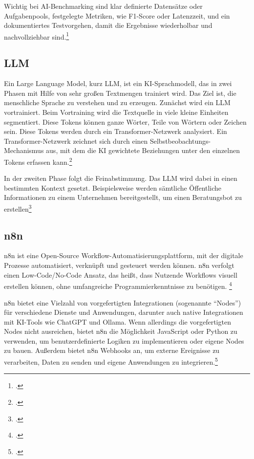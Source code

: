 \documentclass[12pt,a4paper]{article}
\begin{document}
    Wichtig bei AI-Benchmarking sind klar definierte Datensätze oder Aufgabenpools, festgelegte Metriken, wie F1-Score oder Latenzzeit, und ein dokumentiertes Testvorgehen, damit die Ergebnisse wiederholbar und nachvollziehbar sind.\footcite{Benchmarking-AI-Models-in-Software-Engineering}

    \subsection{LLM}
    Ein Large Language Model, kurz LLM, ist ein KI-Sprachmodell, das in zwei Phasen mit Hilfe von sehr großen Textmengen
    trainiert wird. Das Ziel ist, die menschliche Sprache zu verstehen und zu erzeugen. Zunächst wird ein LLM
    vortrainiert. Beim Vortraining wird die Textquelle in viele kleine Einheiten segmentiert. Diese Tokens können ganze
    Wörter, Teile von Wörtern oder Zeichen sein. Diese Tokens werden durch ein Transformer-Netzwerk analysiert. Ein
    Transformer-Netzwerk zeichnet sich durch einen Selbstbeobachtungs-Mechanismus aus, mit dem die KI gewichtete
    Beziehungen unter den einzelnen Tokens erfassen kann.\footnote{\cite{strykerLlmsDefinition}.}

    In der zweiten Phase folgt die Feinabstimmung. Das LLM wird dabei in einen bestimmten Kontext gesetzt.
    Beispielsweise werden sämtliche Öffentliche Informationen zu einem Unternehmen bereitgestellt, um einen Beratungsbot
    zu erstellen\footnote{\cite{strykerLlmsDefinition}.}


    \subsection {n8n}
    n8n ist eine Open-Source Workflow-Automatisierungsplattform, mit der digitale Prozesse automatisiert, verknüpft und gesteuert werden können. n8n verfolgt einen Low-Code/No-Code Ansatz, das heißt, dass Nutzende Workflows visuell erstellen können, ohne umfangreiche Programmierkenntnisse zu benötigen. \footcite{n8n-Workflow-Automation}

    n8n bietet eine Vielzahl von vorgefertigten Integrationen (sogenannte "`Nodes"') für verschiedene Dienste und Anwendungen,
    darunter auch native Integrationen mit KI-Tools wie ChatGPT und Ollama. Wenn allerdings die vorgefertigten Nodes nicht ausreichen,
    bietet n8n die Möglichkeit JavaScript oder Python zu verwenden, um benutzerdefinierte Logiken zu implementieren oder
    eigene Nodes zu bauen. Außerdem bietet n8n Webhooks an, um externe Ereignisse zu verarbeiten, Daten zu senden und eigene Anwendungen zu integrieren.\footcite{n8n-docs}
\end{document}
